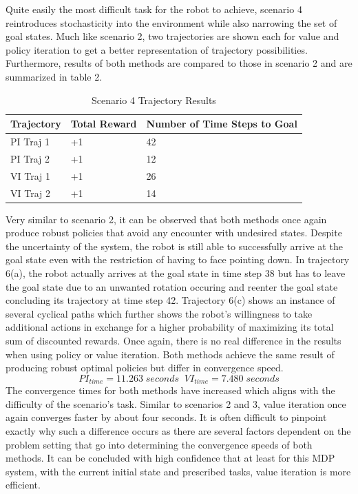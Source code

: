 \documentclass[fullpage]{article}
\begin{document}
Quite easily the most difficult task for the robot to achieve, scenario 4 reintroduces stochasticity into the environment while also narrowing the set of goal states. Much like scenario 2, two trajectories are shown each for value and policy iteration to get a better representation of trajectory possibilities. Furthermore, results of both methods are compared to those in scenario 2 and are summarized in table 2.

\begin{table}[H]
\centering
\begin{tabular}{lll}
\hline
Trajectory & Total Reward & Number of Time Steps to Goal \\ \hline
PI Traj 1  & +1           & 42                           \\
PI Traj 2  & +1           & 12                           \\
VI Traj 1  & +1           & 26                           \\
VI Traj 2  & +1           & 14                          
\end{tabular}
\caption{Scenario 4 Trajectory Results}
\end{table}

Very similar to scenario 2, it can be observed that both methods once again produce robust policies that avoid any encounter with undesired states. Despite the uncertainty of the system, the robot is still able to successfully arrive at the goal state even with the restriction of having to face pointing down. In trajectory 6(a), the robot actually arrives at the goal state in time step 38 but has to leave the goal state due to an unwanted rotation occuring and reenter the goal state concluding its trajectory at time step 42. Trajectory 6(c) shows an instance of several cyclical paths which further shows the robot's willingness to take additional actions in exchange for a higher probability of maximizing its total sum of discounted rewards. Once again, there is no real difference in the results when using policy or value iteration. Both methods achieve the same result of producing robust optimal policies but differ in convergence speed.
\[
PI_{time} = 11.263 \; seconds \; \; VI_{time} = 7.480 \; seconds
\]
The convergence times for both methods have increased which aligns with the difficulty of the scenario's task. Similar to scenarios 2 and 3, value iteration once again converges faster by about four seconds. It is often difficult to pinpoint exactly why such a difference occurs as there are several factors dependent on the problem setting that go into determining the convergence speeds of both methods. It can be concluded with high confidence that at least for this MDP system, with the current initial state and prescribed tasks, value iteration is more efficient.
\end{document}
